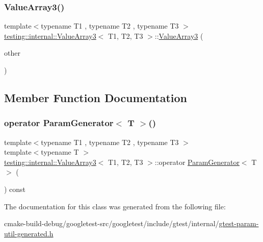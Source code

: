 \mbox{\label{classtesting_1_1internal_1_1ValueArray3_a742d8b00de6b63b020740ebbc7bc8d31}} 
\subsubsection{\texorpdfstring{ValueArray3()}{ValueArray3()}\hspace{0.1cm}{\footnotesize\ttfamily [2/2]}}
{\footnotesize\ttfamily template$<$typename T1 , typename T2 , typename T3 $>$ \\
\mbox{\hyperlink{classtesting_1_1internal_1_1ValueArray3}{testing\+::internal\+::\+Value\+Array3}}$<$ T1, T2, T3 $>$\+::\mbox{\hyperlink{classtesting_1_1internal_1_1ValueArray3}{Value\+Array3}} (\begin{DoxyParamCaption}\item[{const \mbox{\hyperlink{classtesting_1_1internal_1_1ValueArray3}{Value\+Array3}}$<$ T1, T2, T3 $>$ \&}]{other }\end{DoxyParamCaption})\hspace{0.3cm}{\ttfamily [inline]}}



\subsection{Member Function Documentation}
\mbox{\label{classtesting_1_1internal_1_1ValueArray3_a4922d1cf7af801e82bdead15817b23fc}} 
\subsubsection{\texorpdfstring{operator ParamGenerator$<$ T $>$()}{operator ParamGenerator< T >()}}
{\footnotesize\ttfamily template$<$typename T1 , typename T2 , typename T3 $>$ \\
template$<$typename T $>$ \\
\mbox{\hyperlink{classtesting_1_1internal_1_1ValueArray3}{testing\+::internal\+::\+Value\+Array3}}$<$ T1, T2, T3 $>$\+::operator \mbox{\hyperlink{classtesting_1_1internal_1_1ParamGenerator}{Param\+Generator}}$<$ T $>$ (\begin{DoxyParamCaption}{ }\end{DoxyParamCaption}) const\hspace{0.3cm}{\ttfamily [inline]}}



The documentation for this class was generated from the following file\+:\begin{DoxyCompactItemize}
\item 
cmake-\/build-\/debug/googletest-\/src/googletest/include/gtest/internal/\mbox{\hyperlink{gtest-param-util-generated_8h}{gtest-\/param-\/util-\/generated.\+h}}\end{DoxyCompactItemize}
